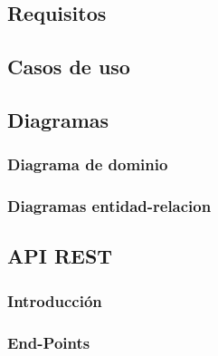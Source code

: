 
\subsection{Requisitos}
\subsection{Casos de uso}
\subsection{Diagramas}
    \subsubsection{Diagrama de dominio}
    \subsubsection{Diagramas entidad-relacion}
\subsection{API REST}
    \subsubsection{Introducción}
    \subsubsection{End-Points}